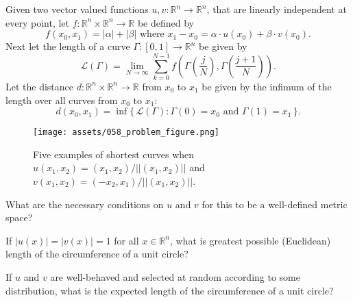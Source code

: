 \documentclass{article}
\begin{document}
Given two vector valued functions
$u, v\colon \mathbb{R}^n \rightarrow \mathbb{R}^n$, that are linearly
independent at every point, let
$f\colon \mathbb{R}^n \times \mathbb{R}^n \rightarrow \mathbb{R}$ be
defined by \[
  f(x_0, x_1) = |\alpha| + |\beta| \text{ where }
  x_1 - x_0 = \alpha \cdot u(x_0) + \beta \cdot v(x_0).
\]
Next let the length of a curve $\Gamma\colon [0, 1] \rightarrow \mathbb{R}^n$
be given by \[
  \mathcal{L}(\Gamma) = \lim_{N \rightarrow \infty} \sum_{k = 0}^{N - 1} f\left(
    \Gamma\left(\frac{j}{N}\right), \Gamma\left(\frac{j + 1}{N}\right)
  \right).
\]
Let the distance $d: \mathbb{R}^n \times \mathbb{R}^n \rightarrow \mathbb{R}$
from $x_0$ to $x_1$ be given by the infimum of the length over all curves from
$x_0$ to $x_1$: \[
  d(x_0, x_1) = \inf\{\,\mathcal{L}(\Gamma): \Gamma(0) = x_0 \text{ and } \Gamma(1) = x_1\,\}.
\]
\begin{figure}[ht!]
  \centering
  \texttt{[image: assets/058\_problem\_figure.png]}
  \caption{
    Five examples of shortest curves when
    $u(x_1, x_2) = (x_1, x_2)/||(x_1, x_2)||$ and
    $v(x_1, x_2) = (-x_2, x_1)/||(x_1, x_2)||$.
  }
\end{figure}
\begin{question}
  What are the necessary conditions on $u$ and $v$ for this to be a well-defined
  metric space?
\end{question}
\begin{related}
  \item If $|u(x)| = |v(x)| = 1$ for all $x \in \mathbb{R}^n$, what is greatest
    possible (Euclidean) length of the circumference of a unit circle?
  \item If $u$ and $v$ are well-behaved and selected at random according to some
    distribution, what is the expected length of the circumference of a unit
    circle?
\end{related}
\end{document}

